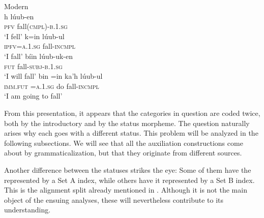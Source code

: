 \documentclass[output=paper]{langsci/langscibook}
\begin{document}
\ea\label{ex:lehmann:13}
Modern  \\
\ea 
\gll h    lúub-en\\
  \textsc{pfv}  fall(\textsc{cmpl)-b.1.sg}\\
\glt ‘I fell’
\ex 
\gll k=in        lúub-ul\\
  \textsc{ipfv=a.1.sg}  fall-\textsc{incmpl}\\
\glt ‘I fall’
\ex 
\gll bíin  lúub-uk-en\\
\textsc{fut}  fall-\textsc{subj-b.1.sg}\\
\glt ‘I will fall’
\ex 
\gll bin      =in      ka’h    lúub-ul\\
\textsc{imm.fut}  =\textsc{a.1.sg}    do      fall-\textsc{incmpl}\\
\glt ‘I am going to fall’
\z
\z 

From this presentation, it appears that the categories in question are coded twice, both by the introductory  and by the status morpheme. The question naturally arises why each  goes with a different status. This problem will be analyzed in the following subsections. We will see that all the auxiliation constructions come about by grammaticalization, but that they originate from different sources.

Another difference between the statuses strikes the eye: Some of them have the  represented by a Set A index, while others have it represented by a Set B index. This is the alignment split already mentioned in . Although it is not the main object of the ensuing analyses, these will nevertheless contribute to its understanding.
\end{document}
